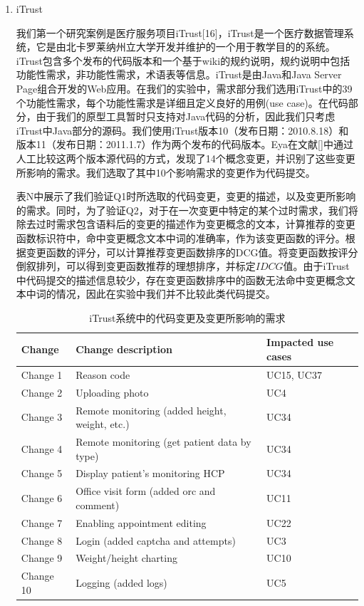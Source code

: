 \begin{enumerate}
  \item iTrust

  我们第一个研究案例是医疗服务项目iTrust[16]，iTrust是一个医疗数据管理系统，它是由北卡罗莱纳州立大学开发并维护的一个用于教学目的的系统。iTrust包含多个发布的代码版本和一个基于wiki的规约说明，规约说明中包括功能性需求，非功能性需求，术语表等信息。iTrust是由Java和Java Server Page组合开发的Web应用。在我们的实验中，需求部分我们选用iTrust中的39个功能性需求，每个功能性需求是详细且定义良好的用例(use case)。在代码部分，由于我们的原型工具暂时只支持对Java代码的分析，因此我们只考虑iTrust中Java部分的源码。我们使用iTrust版本10（发布日期：2010.8.18）和版本11（发布日期：2011.1.7）作为两个发布的代码版本。Eya在文献[]中通过人工比较这两个版本源代码的方式，发现了14个概念变更，并识别了这些变更所影响的需求。我们选取了其中10个影响需求的变更作为代码提交。

  表N中展示了我们验证Q1时所选取的代码变更，变更的描述，以及变更所影响的需求。同时，为了验证Q2，对于在一次变更中特定的某个过时需求，我们将除去过时需求包含语料后的变更的描述作为变更概念的文本，计算推荐的变更函数标识符中，命中变更概念文本中词的准确率，作为该变更函数的评分。根据变更函数的评分，可以计算推荐变更函数排序的DCG值。将变更函数按评分倒叙排列，可以得到变更函数推荐的理想排序，并标定$IDCG$值。由于iTrust中代码提交的描述信息较少，存在变更函数排序中的函数无法命中变更概念文本中词的情况，因此在实验中我们并不比较此类代码提交。

  \begin{table}[]
  \centering
  \caption{iTrust系统中的代码变更及变更所影响的需求}
  \label{my-label}
  \begin{tabular}{@{}lll@{}}
  \toprule
  Change & Change description                             & Impacted use cases \\ \midrule
  Change 1          & Reason code                                    & UC15, UC37         \\
  Change 2          & Uploading photo                                & UC4                \\
  Change 3          & Remote monitoring (added height, weight, etc.) & UC34               \\
  Change 4          & Remote monitoring (get patient data by type)   & UC34               \\
  Change 5          & Display patient’s monitoring HCP               & UC34               \\
  Change 6          & Office visit form (added orc and comment)      & UC11               \\
  Change 7          & Enabling appointment editing                   & UC22               \\
  Change 8          & Login (added captcha and attempts)             & UC3                \\
  Change 9          & Weight/height charting                         & UC10               \\
  Change 10         & Logging (added logs)                           & UC5                \\ \bottomrule
  \end{tabular}
  \end{table}


\end{enumerate}
